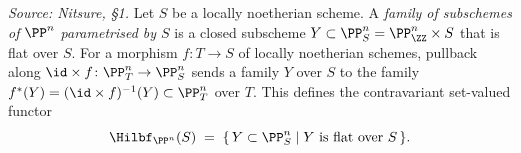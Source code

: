 \begin{definition}
  \label{def:hilbert-functor-pn}
  \textit{Source: Nitsure, §1.}
  Let $S$ be a locally noetherian scheme. A \emph{family of subschemes of
  $\PP^n$ parametrised by $S$} is a closed subscheme $Y\subset\PP^n_S =
  \PP^n_{\ZZ}\times S$ that is flat over $S$. For a morphism $f\colon T\to S$ of
  locally noetherian schemes, pullback along $\id\times f\colon\PP^n_T\to\PP^n_S$
  sends a family $Y$ over $S$ to the family $f^*(Y) = (\id\times f)^{-1}(Y)
  \subset\PP^n_T$ over $T$. This defines the contravariant set-valued functor
  \[
    \Hilbf_{\PP^n}(S) \;=\; \{\, Y\subset\PP^n_S \mid Y \text{ is flat over } S \,\}.
  \]
\end{definition}

